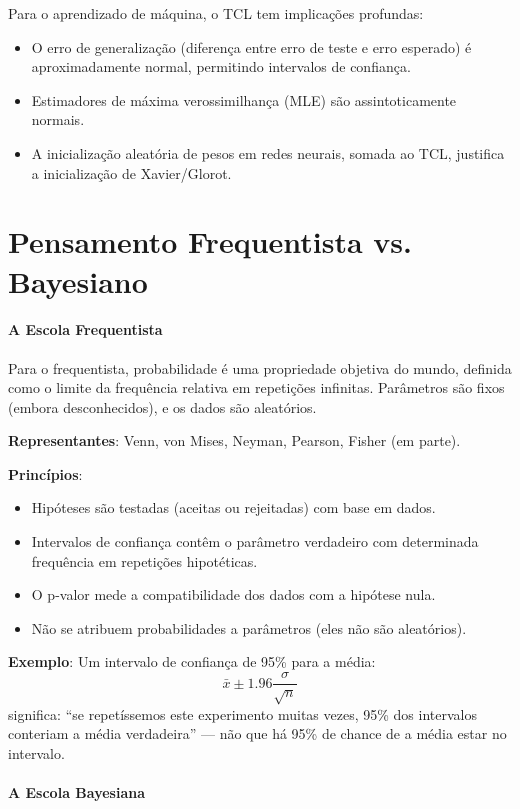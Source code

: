 \documentclass{tufte-handout}
\begin{document}
Para o aprendizado de máquina, o TCL tem implicações profundas:
\begin{itemize}
    \item O erro de generalização (diferença entre erro de teste e erro esperado) é
    aproximadamente normal, permitindo intervalos de confiança.
    \item Estimadores de máxima verossimilhança (MLE) são assintoticamente normais.
    \item A inicialização aleatória de pesos em redes neurais, somada ao TCL, justifica
    a inicialização de Xavier/Glorot.
\end{itemize}

\section{Pensamento Frequentista vs. Bayesiano}

\paragraph{A Escola Frequentista}

Para o frequentista, probabilidade é uma propriedade objetiva do mundo, definida como
o limite da frequência relativa em repetições infinitas. Parâmetros são fixos
(embora desconhecidos), e os dados são aleatórios.

\textbf{Representantes}: Venn, von Mises, Neyman, Pearson, Fisher (em parte).

\textbf{Princípios}:
\begin{itemize}
    \item Hipóteses são testadas (aceitas ou rejeitadas) com base em dados.
    \item Intervalos de confiança contêm o parâmetro verdadeiro com determinada
    frequência em repetições hipotéticas.
    \item O p-valor mede a compatibilidade dos dados com a hipótese nula.
    \item Não se atribuem probabilidades a parâmetros (eles não são aleatórios).
\end{itemize}

\textbf{Exemplo}: Um intervalo de confiança de 95\% para a média:
\[
\bar{x} \pm 1.96 \frac{\sigma}{\sqrt{n}}
\]
significa: ``se repetíssemos este experimento muitas vezes, 95\% dos intervalos conteriam
a média verdadeira'' --- não que há 95\% de chance de a média estar no intervalo.

\paragraph{A Escola Bayesiana}
\end{document}
